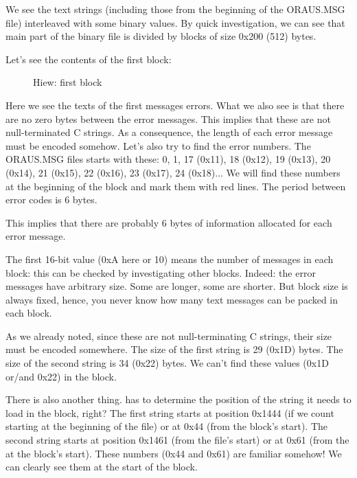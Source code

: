 We see the text strings (including those from the beginning of the ORAUS.MSG file) 
interleaved with some binary values.
By quick investigation, we can see that main part of the binary file is divided by blocks of 
size 0x200 (512) bytes.

\clearpage
Let's see the contents of the first block:

\begin{figure}[H]
\centering
{}
\caption{Hiew: first block}
\label{fig:oracle_MSB_2}
\end{figure}

Here we see the texts of the first messages errors.
What we also see is 
that there are no zero bytes between the error messages.
This implies that these are not null-terminated C strings.
As a consequence, 
the length of each error message must be encoded somehow.
Let's also try to find the error numbers.
The ORAUS.MSG files starts with these: 
0, 1, 17 (0x11), 18 (0x12), 19 (0x13), 20 (0x14), 21 (0x15), 22 (0x16), 23 (0x17), 24 (0x18)...
We will find these numbers at the beginning 
of the block and mark them with red lines.
The period between error codes is 6 bytes.

This implies that there are probably 6 bytes of information allocated for each error message.

The first 16-bit value (0xA here or 10) means the number of messages in each block: this can be checked by investigating other blocks.
Indeed: the error messages have arbitrary size. 
Some are longer, some are shorter. 
But block size is always fixed, hence,
you never know how many text messages can be packed in each block.

As we already noted, since these are not null-terminating C strings, their size must be encoded somewhere.
The size of the first string  is 
29 (0x1D) bytes.
The size of the second string  
is 34 (0x22) bytes.
We can't find these values (0x1D or/and 0x22) in the block.%

There is also another thing.
\oracle 
has to determine the position of the string it needs to load in the block, right?
The first string  starts 
at  position 0x1444 (if we count starting at the beginning of the file) or at 0x44 (from the block's start).
The second string  
starts at position 0x1461 (from the
file's start) or at 0x61 (from the at the block's start).
These numbers (0x44 and 0x61) are familiar somehow! 
We can clearly see them at the start of the block.

